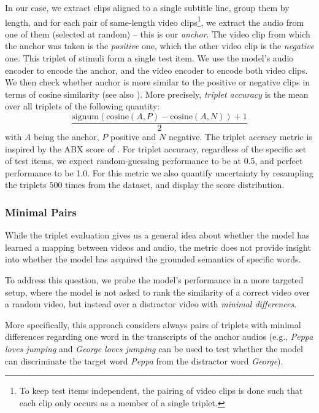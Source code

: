 In our case, we extract clips aligned to a single subtitle
line, group them by length, and for each pair of same-length video
clips\footnote{To keep test items independent, the pairing of video
  clips is done such that each clip only occurs as a member of a single
  triplet.}, we extract the audio from one of them (selected at
random) -- this is our {\it anchor}. The video clip from which the
anchor was taken is the {\it positive} one, which the other video clip
is the {\it negative} one. This triplet of stimuli form a single test
item.  We use the model's audio encoder to encode the anchor, and the
video encoder to encode both video clips. We then check whether anchor
is more similar to the positive or negative clips in terms of cosine
similarity (see also ).  More precisely, {\it triplet 
accuracy} is the mean over
all triplets of the following quantity:
\begin{equation}
  \frac{\mathrm{signum}(\mathrm{cosine}(A, P) - \mathrm{cosine}(A, N)) + 1}{2}
  \label{eq:triplet-acc}
\end{equation}
with $A$ being the anchor, $P$ positive and $N$ negative. The triplet
accracy metric is inspired by the ABX score of \citet{schatz2016abx}.
For triplet accuracy, regardless of the specific set of test items, we
expect random-guessing performance to be at 0.5, and perfect
performance to be 1.0. For this metric we also quantify uncertainty by
resampling the triplets $500$ times from the dataset, and display the
score distribution.

\subsubsection{Minimal Pairs}
\label{sec:targeted}
While the triplet evaluation gives us a general idea about whether the model 
has learned a mapping between videos and audio, the metric does not provide 
insight into whether the model has acquired the grounded semantics of specific 
words.

To address this question, we probe the model's performance in a more targeted 
setup, where the model is not asked to rank the similarity of a correct video 
over a random video, but instead over a distractor video with \textit{minimal 
differences}.

More specifically, this approach considers always pairs of 
triplets with minimal differences regarding one word in the transcripts of
the anchor audios (e.g., \textit{Peppa loves jumping} and
\textit{George loves jumping} can be used to test whether the model
can discriminate the target word \textit{Peppa} from the distractor
word \textit{George}).

